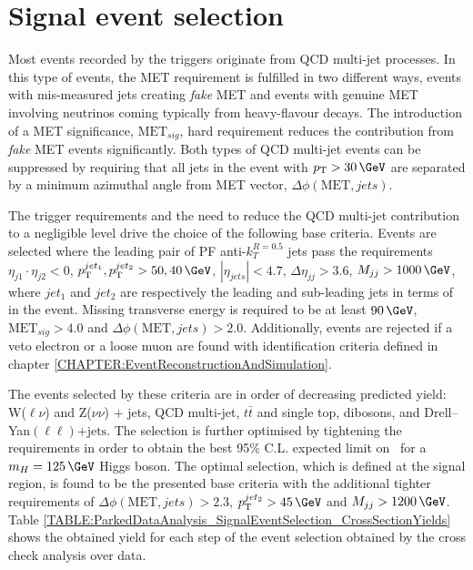 \section{Signal event selection}
\label{SECTION:ParkedDataAnalysis_SignalEventSelection}


Most events recorded by the triggers originate from \gls{QCD} multi-jet processes. In this type of events, the \gls{MET} requirement is fulfilled in two different ways, events with mis-measured jets creating \textit{fake} \gls{MET} and events with genuine \gls{MET} involving neutrinos coming typically from heavy-flavour decays. The introduction of a \gls{MET} significance, $\text{MET}_{sig}$, hard requirement reduces the contribution from \textit{fake} \gls{MET} events significantly. Both types of \gls{QCD} multi-jet events can be suppressed by requiring that all jets in the event with $\pt>30\,\GeV$ are separated by a minimum azimuthal angle from \gls{MET} vector, $\Delta\phi(\text{MET},jets)$.

The trigger requirements and the need to reduce the \gls{QCD} multi-jet contribution to a negligible level drive the choice of the following base criteria. Events are selected where the leading pair of \gls{PF} anti-$k_T^{R=0.5}$ jets pass the requirements $\eta_{j1} \cdot \eta_{j2}<0$, $\pt^{jet_1},\pt^{jet_2} > 50,40\,\GeV$, $|\eta_{jets}| < 4.7$, $\Delta\eta_{jj}>3.6$, $M_{jj}>1000\,\GeV$,  where $jet_1$ and $jet_2$ are respectively the leading and sub-leading jets in terms of \pt in the event. Missing transverse energy is required to be at least $90\,\GeV$, $\text{MET}_{sig}>4.0$ and $\Delta\phi(\text{MET},jets)>2.0$. Additionally, events are rejected if a veto electron or a loose muon are found with identification criteria defined in chapter \ref{CHAPTER:EventReconstructionAndSimulation}.

The events selected by these criteria are in order of decreasing predicted yield: W($\ell\nu$) and Z($\nu\nu$) + jets, \gls{QCD} multi-jet, $t\bar{t}$ and single top, dibosons, and Drell--Yan$(\ell\ell)\text{+jets}$. The selection is further optimised by tightening the requirements in order to obtain the best 95\% C.L. expected limit on \BRinv\, for a $m_H=125\,\GeV$ Higgs boson. The optimal selection, which is defined at the signal region, is found to be the presented base criteria with the additional tighter requirements of $\Delta\phi(\text{MET},jets)>2.3$, $\pt^{jet_2}>45\,\GeV$ and $M_{jj}>1200\,\GeV$. Table \ref{TABLE:ParkedDataAnalysis_SignalEventSelection_CrossSectionYields} shows the obtained yield for each step of the event selection obtained by the cross check analysis over data.


